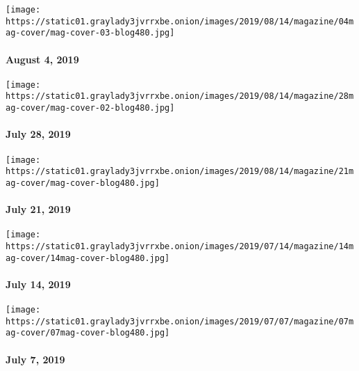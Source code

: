 \texttt{[image: https://static01.graylady3jvrrxbe.onion/images/2019/08/14/magazine/04mag-cover/mag-cover-03-blog480.jpg]}

\hypertarget{august-4-2019}{%
\paragraph{August 4, 2019}\label{august-4-2019}}

\href{https://www.nytimes3xbfgragh.onion/issue/magazine/2019/08/14/the-72819-issue}{}

\texttt{[image: https://static01.graylady3jvrrxbe.onion/images/2019/08/14/magazine/28mag-cover/mag-cover-02-blog480.jpg]}

\hypertarget{july-28-2019}{%
\paragraph{July 28, 2019}\label{july-28-2019}}

\href{https://www.nytimes3xbfgragh.onion/issue/magazine/2019/08/14/the-72119-issue}{}

\texttt{[image: https://static01.graylady3jvrrxbe.onion/images/2019/08/14/magazine/21mag-cover/mag-cover-blog480.jpg]}

\hypertarget{july-21-2019}{%
\paragraph{July 21, 2019}\label{july-21-2019}}

\href{https://www.nytimes3xbfgragh.onion/issue/magazine/2019/07/11/the-71419-issue}{}

\texttt{[image: https://static01.graylady3jvrrxbe.onion/images/2019/07/14/magazine/14mag-cover/14mag-cover-blog480.jpg]}

\hypertarget{july-14-2019}{%
\paragraph{July 14, 2019}\label{july-14-2019}}

\href{https://www.nytimes3xbfgragh.onion/issue/magazine/2019/07/09/the-7719-issue}{}

\texttt{[image: https://static01.graylady3jvrrxbe.onion/images/2019/07/07/magazine/07mag-cover/07mag-cover-blog480.jpg]}

\hypertarget{july-7-2019}{%
\paragraph{July 7, 2019}\label{july-7-2019}}

